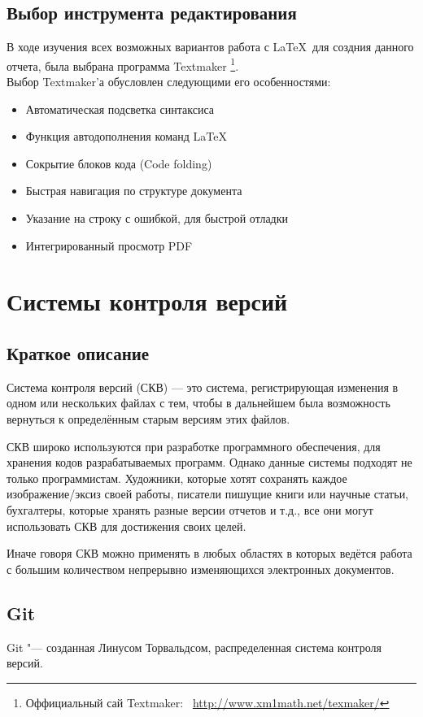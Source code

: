 \documentclass{article}
\begin{document}
		\subsection{Выбор инструмента редактирования}
			В ходе изучения всех возможных вариантов работа с \LaTeX ~для создния данного отчета, была выбрана программа 						Textmaker
			\footnote{Оффициальный сай Textmaker:~ \href{http://www.xm1math.net/texmaker/}{http://www.xm1math.net/texmaker/}}.\\
			Выбор Textmaker'а обусловлен следующими его особенностями:
			\begin{itemize} 
	    		\item	Автоматическая подсветка синтаксиса
	    		\item	Функция автодополнения команд \LaTeX
	    		\item	Сокрытие блоков кода (Code folding)
	    		\item	Быстрая навигация по структуре документа
	    		\item	Указание на строку с ошибкой, для быстрой отладки
	    		\item	Интегрированный просмотр PDF
			\end{itemize} 
	\newpage
	\section{Системы контроля версий}
		\subsection{Краткое описание}
			Система контроля версий (СКВ) — это система, регистрирующая изменения в одном или нескольких файлах с тем, чтобы в 				дальнейшем была возможность вернуться к определённым старым версиям этих файлов. 
				
			СКВ широко используются при разработке программного обеспечения, для хранения кодов разрабатываемых программ. Однако 			данные системы подходят не только программистам. Художники, которые хотят сохранять каждое изображение/эксиз своей 					работы, писатели пишущие книги или научные статьи, бухгалтеры, которые хранять разные версии отчетов и т.д., все они 				могут использовать СКВ для достижения своих целей.
				
			Иначе говоря СКВ можно применять в любых областях в которых ведётся работа с большим количеством непрерывно 					изменяющихся электронных документов.
		\subsection{Git}
			Git "--- созданная Линусом Торвальдсом, распределенная система контроля версий.
\end{document}
